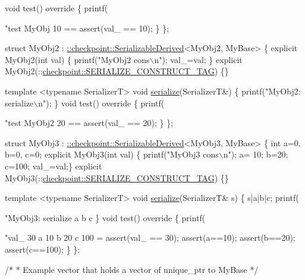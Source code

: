 \begin{DoxyCodeInclude}
{  \textcolor{keywordtype}{void} test()\textcolor{keyword}{ override }\{
    printf(\textcolor{stringliteral}{"test MyObj 10 == %
    assert(val\_ == 10);
  \}
\};

\textcolor{keyword}{struct }MyObj2 : \hyperlink{structcheckpoint_1_1dispatch_1_1vrt_1_1_serializable_derived}{::checkpoint::SerializableDerived}<MyObj2, MyBase> \{
  \textcolor{keyword}{explicit} MyObj2(\textcolor{keywordtype}{int} val) \{ printf(\textcolor{stringliteral}{"MyObj2 cons\(\backslash\)n"}); val\_=val; \}
  \textcolor{keyword}{explicit} MyObj2(::\hyperlink{structcheckpoint_1_1dispatch_1_1_s_e_r_i_a_l_i_z_e___c_o_n_s_t_r_u_c_t___t_a_g}{checkpoint::SERIALIZE\_CONSTRUCT\_TAG}) \{\}

  \textcolor{keyword}{template} <\textcolor{keyword}{typename} SerializerT>
  \textcolor{keywordtype}{void} \hyperlink{namespacecheckpoint_a075da4e7344cf037943362517e606c3a}{serialize}(SerializerT&) \{
    printf(\textcolor{stringliteral}{"MyObj2: serialize\(\backslash\)n"});
  \}
  \textcolor{keywordtype}{void} test()\textcolor{keyword}{ override }\{
    printf(\textcolor{stringliteral}{"test MyObj2 20 == %
    assert(val\_ == 20);
  \}
\};

\textcolor{keyword}{struct }MyObj3 : \hyperlink{structcheckpoint_1_1dispatch_1_1vrt_1_1_serializable_derived}{::checkpoint::SerializableDerived}<MyObj3, MyBase> \{
  \textcolor{keywordtype}{int} a=0, b=0, c=0;
  \textcolor{keyword}{explicit} MyObj3(\textcolor{keywordtype}{int} val) \{ printf(\textcolor{stringliteral}{"MyObj3 cons\(\backslash\)n"}); a= 10; b=20; c=100; val\_=val;\}
  \textcolor{keyword}{explicit} MyObj3(::\hyperlink{structcheckpoint_1_1dispatch_1_1_s_e_r_i_a_l_i_z_e___c_o_n_s_t_r_u_c_t___t_a_g}{checkpoint::SERIALIZE\_CONSTRUCT\_TAG}) \{\}

  \textcolor{keyword}{template} <\textcolor{keyword}{typename} SerializerT>
  \textcolor{keywordtype}{void} \hyperlink{namespacecheckpoint_a075da4e7344cf037943362517e606c3a}{serialize}(SerializerT& s) \{
    s|a|b|c;
    printf(\textcolor{stringliteral}{"MyObj3: serialize a b c %
  \}
  \textcolor{keywordtype}{void} test()\textcolor{keyword}{ override }\{
    printf(\textcolor{stringliteral}{"val\_ 30  a 10 b 20 c 100 = %
    assert(val\_ == 30);
    assert(a==10);
    assert(b==20);
    assert(c==100);
  \}
\};

\textcolor{comment}{/*}
\textcolor{comment}{ * Example vector that holds a vector of unique\_ptr to MyBase}
\textcolor{comment}{ */}

}}}}}
\end{DoxyCodeInclude}
